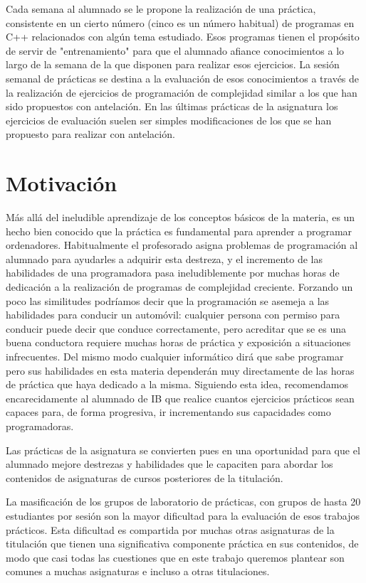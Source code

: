 \documentclass[twocolumn,twoside,a4paper, 10pt]{article}
\begin{document}
Cada semana al alumnado se le propone la realización de una práctica, consistente en un cierto número (cinco
es un número habitual) de programas en C++ relacionados con algún tema estudiado.
Esos programas tienen el propósito de servir de "entrenamiento" para que el alumnado afiance conocimientos a
lo largo de la semana de la que disponen para realizar esos ejercicios.
La sesión semanal de prácticas se destina a la evaluación de esos conocimientos a través de la realización de
ejercicios de programación de complejidad similar a los que han sido propuestos con antelación.
En las últimas prácticas de la asignatura los ejercicios de evaluación suelen ser simples modificaciones de 
los que se han propuesto para realizar con antelación.


\section{Motivación}
Más allá del ineludible aprendizaje de los conceptos básicos de la materia, 
es un hecho bien conocido que la práctica es fundamental para aprender a programar ordenadores. 
Habitualmente el profesorado asigna problemas de programación al alumnado para ayudarles a adquirir esta 
destreza, y el incremento de las habilidades de una programadora pasa ineludiblemente por muchas horas de dedicación 
a la realización de programas de complejidad creciente.
Forzando un poco las similitudes podríamos decir que la programación se asemeja a las habilidades para
conducir un automóvil: cualquier persona con permiso para conducir puede decir que conduce correctamente, pero
acreditar que se es una buena conductora requiere muchas horas de práctica y exposición a situaciones
infrecuentes.
Del mismo modo cualquier informático dirá que sabe programar pero sus habilidades en esta materia dependerán
muy directamente de las horas de práctica que haya dedicado a la misma.
Siguiendo esta idea, recomendamos encarecidamente al alumnado de IB que realice cuantos ejercicios prácticos
sean capaces para, de forma progresiva, ir incrementando sus capacidades como programadoras.

Las prácticas de la asignatura se convierten pues en una oportunidad para que el alumnado mejore destrezas y
habilidades que le capaciten para abordar los contenidos de asignaturas de cursos posteriores de la
titulación.

La masificación de los grupos de laboratorio de prácticas, con grupos de hasta 20 estudiantes por sesión son
la mayor dificultad para la evaluación de esos trabajos prácticos.
Esta dificultad es compartida por muchas otras asignaturas de la titulación que tienen una significativa
componente práctica en sus contenidos, de modo que casi todas las cuestiones que en este trabajo queremos
plantear son comunes a muchas asignaturas e incluso a otras titulaciones.
\end{document}
